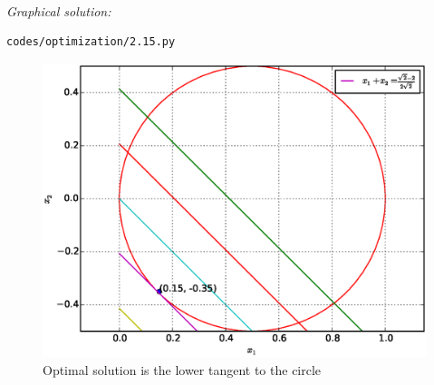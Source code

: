 \begin{enumerate}[label=\arabic*.,ref=\thesubsection.\theenumi]
\solution 
%
\\
{\em Graphical solution:} 
%
%	
\begin{lstlisting}
codes/optimization/2.15.py
\end{lstlisting}

%
%
\begin{figure}[!ht]
\centering
\includegraphics[width=\columnwidth]{./optimization/figs/2.15.eps}
\caption{ Optimal solution is the lower tangent to the circle}
\label{fig.2.15}	
\end{figure}
\end{enumerate}
